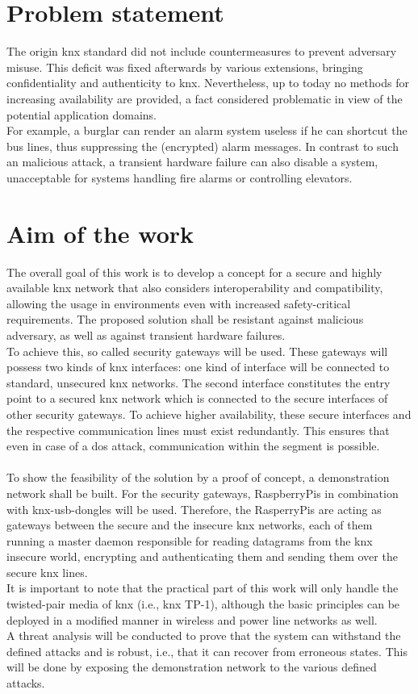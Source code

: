 \section{Problem statement}
The origin \gls{knx} standard did not include countermeasures to prevent adversary misuse. This deficit was fixed afterwards by various extensions, bringing confidentiality and
authenticity to \gls{knx}. Nevertheless, up to today no methods for increasing availability are provided, a fact considered problematic in view of the potential application domains.
\\
For example, a burglar can render an alarm system useless if he can shortcut the bus lines, thus suppressing the (encrypted) alarm messages. In contrast to such an malicious attack, a transient
hardware failure can also disable a system, unacceptable for systems handling fire alarms or controlling elevators.

\section{Aim of the work}

The overall goal of this work is to develop a concept for a secure and highly available \gls{knx} network that also considers interoperability and compatibility, 
allowing the usage in environments even with increased safety-critical requirements. The proposed solution shall be resistant against malicious adversary, as well as against
transient hardware failures.
\\
To achieve this, so called security gateways will be used. These gateways will possess two kinds of \gls{knx} interfaces: one kind of interface will be
connected to standard, unsecured \gls{knx} networks.
The second interface constitutes the entry point to a secured \gls{knx} network which is connected to the secure interfaces of other
security gateways. To achieve higher availability, these secure interfaces and the respective communication lines must exist redundantly. This ensures that
even in case of a \gls{dos} attack, communication within the segment is possible.
\\
\\
To show the feasibility of the solution by a proof of concept, a demonstration network shall be built.
For the security gateways, RaspberryPis in combination with \gls{knx}-\gls{usb}-dongles will be used. Therefore, the RasperryPis
are acting as gateways between the secure and the insecure \gls{knx} networks, each of them running a master daemon responsible
for reading datagrams from the \gls{knx} insecure world, encrypting and authenticating them and sending them over the secure
\gls{knx} lines.
\\
It is important to note that the practical part of this work will only
handle the twisted-pair media of \gls{knx} (i.e., \gls{knx} \gls{TP}-1), although the basic principles can be deployed in a modified manner in
wireless and power line networks as well.
\\
A threat analysis will be conducted to prove that the system can withstand the defined attacks and is robust,
i.e., that it can recover from erroneous states. This will be done by exposing the demonstration network to the various defined attacks. 

